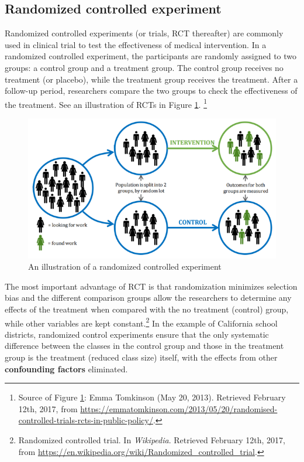\documentclass[a4paper,11pt]{article}
\begin{document}
\subsection*{Randomized controlled experiment}
\label{sec:org14671f6}

Randomized controlled experiments (or trials, RCT thereafter) are
commonly used in clinical trial to test the effectiveness of medical
intervention. In a randomized controlled experiment, the participants
are randomly assigned to two groups: a control group and a treatment
group. The control group receives no treatment (or placebo), while the
treatment group receives the treatment. After a follow-up period,
researchers compare the two groups to check the effectiveness of the
treatment. See an illustration of RCTs in Figure \ref{fig:orgd2cc4d5}. \footnote{Source of Figure \ref{fig:orgd2cc4d5}: Emma Tomkinson (May 20,
2013). Retrieved February 12th, 2017, from
\url{https://emmatomkinson.com/2013/05/20/randomised-controlled-trials-rcts-in-public-policy/}.}

\begin{figure}[htbp]
\centering
\includegraphics[width=1.0\textwidth]{figure/rct_example.png}
\caption{\label{fig:orgd2cc4d5}
An illustration of a randomized controlled experiment}
\end{figure}

The most important advantage of RCT is that randomization minimizes
selection bias and the different comparison groups allow the
researchers to determine any effects of the treatment when compared
with the no treatment (control) group, while other variables are kept
constant.\footnote{Randomized controlled trial. In \emph{Wikipedia}. Retrieved February
12th, 2017, from
\url{https://en.wikipedia.org/wiki/Randomized\_controlled\_trial}.} In the example of California school districts,
randomized control experiments ensure that the only systematic difference
between the classes in the control group and those in the treatment
group is the treatment (reduced class size) itself, with the effects
from other \textbf{confounding factors} eliminated. 
\end{document}
